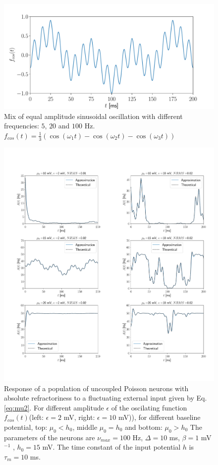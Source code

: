 \documentclass[12pt,twoside]{report}
\begin{document}
\begin{figure}[h!]
	\centering
	\includegraphics[width=0.8\linewidth]{fcos.pdf}
	\caption{Mix of equal amplitude sinusoidal oscillation with different frequencies: $5$, $20$ and $100$ Hz. $f_{cos}(t)=\frac{1}{3}\left(\cos(\omega_1t)-\cos(\omega_2t)-\cos(\omega_3t)\right)$
	}
	\label{fig:fcos}
\end{figure}


\begin{figure}[h!]
	\centering
	\includegraphics[width=0.9\linewidth]{A_t.pdf}
	\caption{Response of a population of uncoupled Poisson neurons with absolute refractoriness to a fluctuating external input given by Eq.\eqref{eq:mu2}. For different amplitude $\epsilon$ of the oscilating function $f_{cos}(t)$(left: $\epsilon=2$ mV, right: $\epsilon=10$ mV)), for different baseline potential, top: $\mu_0 < h_0$, middle  $\mu_0 = h_0$ and bottom: $\mu_0 > h_0$ The parameters of the neurons are $\nu_{max}=100$ Hz, $\Delta=10$ ms, $\beta=1$ mV$^{-1}$ , $h_0=15$ mV. The time constant of the input potential $h$ is $\tau_m=10$ ms.
	}
	\label{fig:A_t}
\end{figure}
\end{document}
